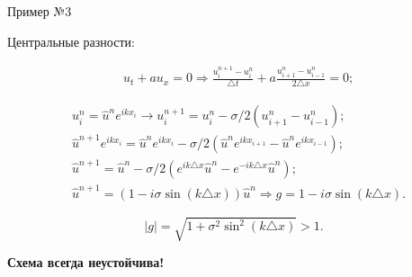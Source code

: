 \documentclass[10pt,xcolor=pst,aspectratio=169]{beamer}
\begin{document}
\begin{frame}{Пример №3}

    \transdissolve[duration=0.1]
    \justifying
    \large

    Центральные разности:

    \[
        \begin{split}
            &u_{t} + a u_{x} = 0 \Rightarrow \frac{u^{n + 1}_{i} - u^{n}_{i}}{\triangle t} + a \frac{u^{n}_{i + 1} - u^{n}_{i - 1}}{2 \triangle x} = 0;
        \end{split}
    \]

    \[
        \begin{split}
            &\boxed{u^{n}_{i} = \hat{u}^{n} e^{i k x_{i}}} \rightarrow \boxed{u^{n + 1}_{i} = u^{n}_{i} - \sigma / 2 \left( u^{n}_{i + 1} - u^{n}_{i - 1} \right)}; \\
            &\hat{u}^{n + 1} e^{i k x_{i}} = \hat{u}^{n} e^{i k x_{i}} - \sigma / 2 \left( \hat{u}^{n} e^{i k x_{i + 1}} - \hat{u}^{n} e^{i k x_{i - 1}} \right); \\
            &\hat{u}^{n + 1} = \hat{u}^{n} - \sigma / 2 \left( e^{i k \triangle x} \hat{u}^{n} - e^{-i k \triangle x} \hat{u}^{n} \right); \\
            &\hat{u}^{n + 1} = \left( 1 - i \sigma \sin{ \left( k \triangle x \right) } \right) \hat{u}^{n} \Rightarrow \boxed{g = 1 - i \sigma \sin{ \left( k \triangle x \right) }}.
        \end{split}
    \]

    \[
        |g| = \sqrt{ 1 + \sigma^{2} \sin^{2}{ \left( k \triangle x \right) }} > 1 .
    \]

    \begin{center}
        \textbf{Схема всегда неустойчива!}
    \end{center}

\end{frame}
\end{document}
